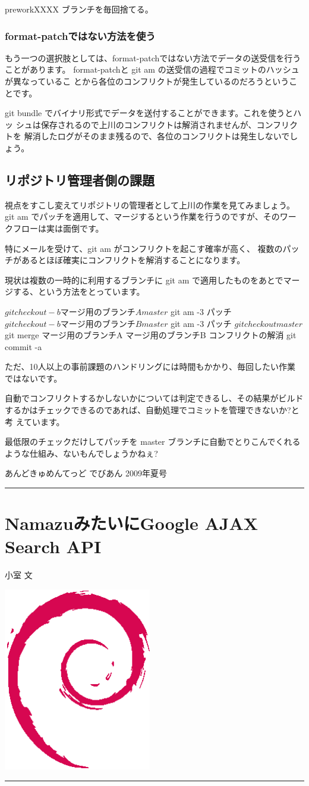 \documentclass[mingoth,a4paper]{jsarticle}
\renewcommand{\dancersection}[2]{%
\newpage
あんどきゅめんてっど でびあん 2009年夏号
%
\vspace{0.1mm}\\
{\color{dancerlightblue}\rule{\hsize}{2mm}}

%
%
\begin{minipage}[t]{0.6\hsize}
\color{dancerdarkblue}
\vspace{1cm}
\section{#1}
\hfill{}#2\\
\end{minipage}
\begin{minipage}[t]{0.4\hsize}
\vspace{-2cm}
\hfill{}\includegraphics[height=8cm]{image200502/openlogo-nd.eps}\\
\vspace{-5cm}
\end{minipage}
%
%
{\color{dancerdarkblue}\rule{0.74\hsize}{2mm}}
%
\vspace{2cm}
}
\begin{document}
preworkXXXX ブランチを毎回捨てる。

\subsubsection{format-patchではない方法を使う}

もう一つの選択肢としては、format-patchではない方法でデータの送受信を行う
ことがあります。
format-patchと git am の送受信の過程でコミットのハッシュが異なっているこ
とから各位のコンフリクトが発生しているのだろうということです。

git bundle でバイナリ形式でデータを送付することができます。これを使うとハッ
シュは保存されるので上川のコンフリクトは解消されませんが、コンフリクトを
解消したログがそのまま残るので、各位のコンフリクトは発生しないでしょう。

\subsection{リポジトリ管理者側の課題}

視点をすこし変えてリポジトリの管理者として上川の作業を見てみましょう。
git am でパッチを適用して、マージするという作業を行うのですが、そのワー
クフローは実は面倒です。

特にメールを受けて、git am がコンフリクトを起こす確率が高く、
複数のパッチがあるとほぼ確実にコンフリクトを解消することになります。

現状は複数の一時的に利用するブランチに git am で適用したものをあとでマー
ジする、という方法をとっています。

\begin{commandline}
$ git checkout -b マージ用のブランチA master
$ git am -3 パッチ
$ git checkout -b マージ用のブランチB master
$ git am -3 パッチ
$ git checkout master 
$ git merge マージ用のブランチA マージ用のブランチB
$ コンフリクトの解消
$ git commit -a 
\end{commandline}

ただ、10人以上の事前課題のハンドリングには時間もかかり、毎回したい作業
ではないです。

自動でコンフリクトするかしないかについては判定できるし、その結果がビルド
するかはチェックできるのであれば、自動処理でコミットを管理できないか?と考
えています。

最低限のチェックだけしてパッチを master ブランチに自動でとりこんでくれる
ような仕組み、ないもんでしょうかねぇ?

\dancersection{NamazuみたいにGoogle AJAX Search API}{小室 文}
\end{document}
